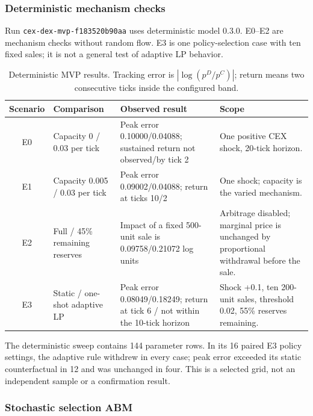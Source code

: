 \subsubsection{Deterministic mechanism checks}

Run \texttt{cex-dex-mvp-f183520b90aa} uses deterministic model 0.3.0. E0--E2 are
mechanism checks without random flow. E3 is one policy-selection case with ten fixed
sales; it is not a general test of adaptive LP behavior.

\begin{table}[!ht]
\centering
\scriptsize
\caption{Deterministic MVP results. Tracking error is $|\log(p^D/p^C)|$; return means
two consecutive ticks inside the configured band.}
\begin{tabularx}{\textwidth}{@{}c >{\raggedright\arraybackslash}p{3.5cm} >{\raggedright\arraybackslash}p{5.1cm} X@{}}
\toprule
\textbf{Scenario} & \textbf{Comparison} & \textbf{Observed result} &
\textbf{Scope} \\
\midrule
E0 & Capacity 0 / 0.03 per tick & Peak error 0.10000/0.04088; sustained return not
  observed/by tick 2 & One positive CEX shock, 20-tick horizon. \\
E1 & Capacity 0.005 / 0.03 per tick & Peak error 0.09002/0.04088; return at ticks
  10/2 & One shock; capacity is the varied mechanism. \\
E2 & Full / 45\% remaining reserves & Impact of a fixed 500-unit sale is
  0.09758/0.21072 log units & Arbitrage disabled; marginal price is unchanged by
  proportional withdrawal before the sale. \\
E3 & Static / one-shot adaptive LP & Peak error 0.08049/0.18249; return at tick 6 /
  not within the 10-tick horizon & Shock +0.1, ten 200-unit sales, threshold 0.02,
  55\% reserves remaining. \\
\bottomrule
\end{tabularx}
\end{table}

The deterministic sweep contains 144 parameter rows. In its 16 paired E3 policy
settings, the adaptive rule withdrew in every case; peak error exceeded its static
counterfactual in 12 and was unchanged in four. This is a selected grid, not an
independent sample or a confirmation result.

\subsubsection{Stochastic selection ABM}

